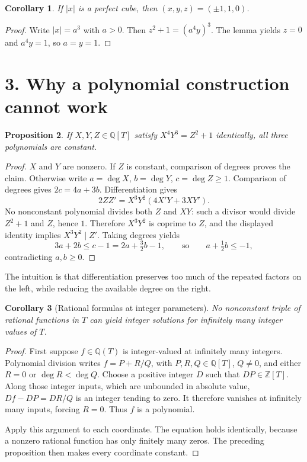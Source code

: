 \documentclass[11pt,a4paper]{article}
\newtheorem{proposition}{Proposition}
\newtheorem{corollary}[proposition]{Corollary}
\begin{document}
\begin{corollary}
If $|x|$ is a perfect cube, then $(x,y,z)=(\pm1,1,0)$.
\end{corollary}
\begin{proof}
Write $|x|=a^3$ with $a>0$. Then $z^2+1=(a^4y)^3$. The lemma yields
$z=0$ and $a^4y=1$, so $a=y=1$.
\end{proof}

\section*{3. Why a polynomial construction cannot work}
\begin{proposition}
If $X,Y,Z\in\mathbb Q[T]$ satisfy $X^4Y^3=Z^2+1$ identically, all three
polynomials are constant.
\end{proposition}
\begin{proof}
$X$ and $Y$ are nonzero. If $Z$ is constant, comparison of degrees proves
the claim. Otherwise write $a=\deg X$, $b=\deg Y$, $c=\deg Z\ge1$.
Comparison of degrees gives $2c=4a+3b$. Differentiation gives
\[
 2ZZ'=X^3Y^2(4X'Y+3XY').
\]
No nonconstant polynomial divides both $Z$ and $XY$: such a divisor would
divide $Z^2+1$ and $Z$, hence $1$. Therefore $X^3Y^2$ is coprime to $Z$,
and the displayed identity implies $X^3Y^2\mid Z'$. Taking degrees yields
\[
 3a+2b\le c-1=2a+\tfrac32b-1,
 \qquad\text{so}\qquad a+\tfrac12b\le-1,
\]
contradicting $a,b\ge0$.
\end{proof}

The intuition is that differentiation preserves too much of the repeated
factors on the left, while reducing the available degree on the right.

\newpage
\begin{corollary}[Rational formulas at integer parameters]
No nonconstant triple of rational functions in $T$ can yield integer solutions
for infinitely many integer values of $T$.
\end{corollary}
\begin{proof}
First suppose $f\in\mathbb Q(T)$ is integer-valued at infinitely many integers.
Polynomial division writes $f=P+R/Q$, with $P,R,Q\in\mathbb Q[T]$,
$Q\ne0$, and either $R=0$ or $\deg R<\deg Q$. Choose a positive integer $D$
such that $DP\in\mathbb Z[T]$. Along those integer inputs, which are unbounded
in absolute value, $Df-DP=DR/Q$ is an integer tending to zero. It therefore
vanishes at infinitely many inputs, forcing $R=0$. Thus $f$ is a polynomial.

Apply this argument to each coordinate. The equation holds identically,
because a nonzero rational function has only finitely many zeros. The preceding
proposition then makes every coordinate constant.
\end{proof}
\end{document}
